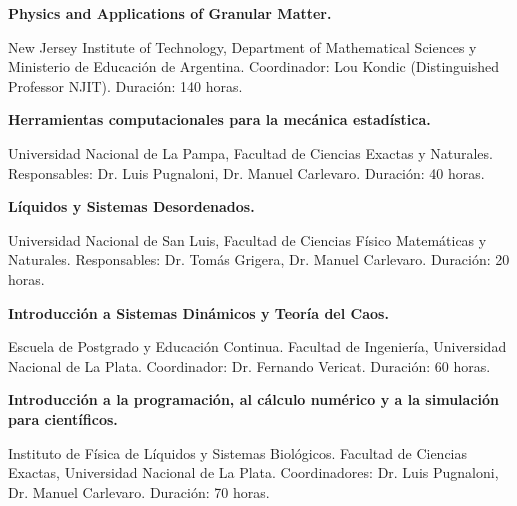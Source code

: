  \textbf{Physics and Applications of Granular Matter.}

New Jersey Institute of Technology, Department of Mathematical Sciences y Ministerio de Educación de Argentina. Coordinador: Lou Kondic (Distinguished Professor NJIT). Duración: 140 horas.

  \textbf{Herramientas computacionales para la mecánica estadística.}

Universidad Nacional de La Pampa, Facultad de Ciencias Exactas y Naturales. Responsables: Dr. Luis Pugnaloni, Dr. Manuel Carlevaro. Duración: 40 horas.

 
 \textbf{Líquidos y Sistemas Desordenados.}

Universidad Nacional de San Luis, Facultad de Ciencias Físico Matemáticas y Naturales. Responsables: Dr. Tomás Grigera, Dr. Manuel Carlevaro. Duración: 20 horas.


  \textbf{Introducción a Sistemas Dinámicos y Teoría del Caos.}
 
 Escuela de Postgrado y Educación Continua. Facultad de Ingeniería, Universidad Nacional de La Plata. Coordinador: Dr. Fernando Vericat. Duración: 60 horas.
 
  \textbf{Introducción a la programación, al cálculo numérico y a la simulación para científicos.}
 
 Instituto de Física de Líquidos y Sistemas Biológicos. Facultad de Ciencias Exactas, Universidad Nacional de La Plata. Coordinadores: Dr. Luis Pugnaloni, Dr. Manuel Carlevaro. Duración: 70 horas.
